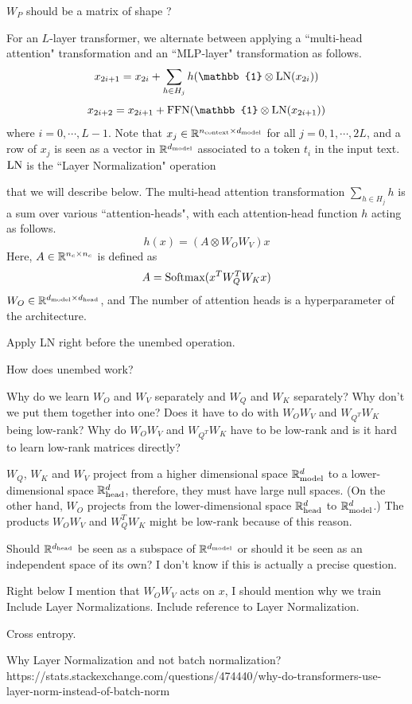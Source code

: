  $W_P$ should be a matrix of shape ?

For an $L$-layer transformer, we alternate between applying a ``multi-head attention" transformation and an ``MLP-layer" transformation as follows. 
\[
x_{2i+1} = x_{2i} + \sum_{h \in H_j} h(\mathbb{1} \otimes \LN(x_{2i})) 
\]
\[
x_{2i + 2} = x_{2i + 1} + \FFN(\mathbb{1} \otimes \LN(x_{2i + 1}))
\]
where $i=0, \cdots, L-1$. Note that $x_j \in \mathbb{R}^{n_{\text{context}} \times d_{\text{model}}}$ for all $j = 0, 1, \cdots, 2L$, and a row of $x_j$ is seen as a vector in $\mathbb{R}^{d_{\text{model}}}$ associated to a token $t_i$ in the input text. $\text{LN}$ is the ``Layer Normalization" operation  


that we will describe below. The multi-head attention transformation $\sum_{h \in H_j} h$ is a sum over various ``attention-heads", with each attention-head function $h$ acting as follows.
\[
h(x) = (A \otimes W_O W_V) x
\]
Here, $A \in \mathbb{R}^{n_c \times n_c}$ is defined as
\[
A = \text{Softmax}(x^T W_Q^T W_K x)
\] 
$W_O \in \mathbb{R}^{d_{\text{model}} \times d_{\text{head}}}$, and 
The number of attention heads is a hyperparameter of the architecture.


Apply LN right before the unembed operation. 

How does unembed work? 

Why do we learn $W_O$ and $W_V$ separately and $W_Q$ and $W_K$ separately? Why don't we put them together into one? Does it have to do with $W_O W_V$ and $W_{Q^T} W_K$ being low-rank? Why do $W_O W_V$ and $W_{Q^T} W_K$ have to be low-rank and is it hard to learn low-rank matrices directly? 

$W_Q$, $W_K$ and $W_V$ project from a higher dimensional space $\mathbb{R}^d_{\text{model}}$ to a lower-dimensional space $\mathbb{R}^d_{\text{head}}$, therefore, they must have large null spaces. (On the other hand, $W_O$ projects from the lower-dimensional space $\mathbb{R}^d_{\text{head}}$ to $\mathbb{R}^d_{\text{model}}$.) The products $W_O W_V$ and  $W_Q^T W_K$ might be low-rank because of this reason.

Should $\mathbb{R}^{d_{\text{head}}}$ be seen as a subspace of $\mathbb{R}^{d_{\text{model}}}$ or should it be seen as an independent space of its own? I don't know if this is actually a precise question. 

Right below I mention that $W_O W_V$ acts on $x$, I should mention why we train 
Include Layer Normalizations. 
Include reference to Layer Normalization. 

Cross entropy.

Why Layer Normalization and not batch normalization? https://stats.stackexchange.com/questions/474440/why-do-transformers-use-layer-norm-instead-of-batch-norm

